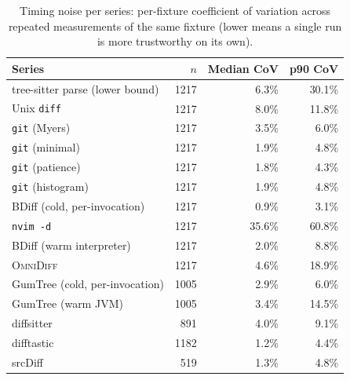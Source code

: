 \begin{table}
  \caption{Timing noise per series: per-fixture coefficient of variation across repeated measurements of the same fixture (lower means a single run is more trustworthy on its own).}
  \label{tab:variance}
  \begin{tabular}{lrrr}
    \toprule
    Series & $n$ & Median CoV & p90 CoV \\
    \midrule
    tree-sitter parse (lower bound) & 1217 & 6.3\% & 30.1\% \\
    Unix \texttt{diff} & 1217 & 8.0\% & 11.8\% \\
    \texttt{git} (Myers) & 1217 & 3.5\% & 6.0\% \\
    \texttt{git} (minimal) & 1217 & 1.9\% & 4.8\% \\
    \texttt{git} (patience) & 1217 & 1.8\% & 4.3\% \\
    \texttt{git} (histogram) & 1217 & 1.9\% & 4.8\% \\
    BDiff (cold, per-invocation) & 1217 & 0.9\% & 3.1\% \\
    \texttt{nvim -d} & 1217 & 35.6\% & 60.8\% \\
    BDiff (warm interpreter) & 1217 & 2.0\% & 8.8\% \\
    \textsc{OmniDiff} & 1217 & 4.6\% & 18.9\% \\
    GumTree (cold, per-invocation) & 1005 & 2.9\% & 6.0\% \\
    GumTree (warm JVM) & 1005 & 3.4\% & 14.5\% \\
    diffsitter & 891 & 4.0\% & 9.1\% \\
    difftastic & 1182 & 1.2\% & 4.4\% \\
    srcDiff & 519 & 1.3\% & 4.8\% \\
    \bottomrule
  \end{tabular}
\end{table}
